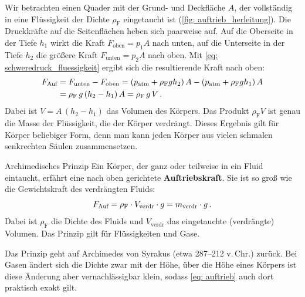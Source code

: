 Wir betrachten einen Quader mit der Grund- und Deckfläche $A$, der vollständig in eine Flüssigkeit der Dichte $\rho_\text{F}$ eingetaucht ist (\cref{fig: auftrieb_herleitung}). Die Druckkräfte auf die Seitenflächen heben sich paarweise auf. Auf die Oberseite in der Tiefe $h_1$ wirkt die Kraft $F_\text{oben} = p_1 A$ nach unten, auf die Unterseite in der Tiefe $h_2$ die größere Kraft $F_\text{unten} = p_2 A$ nach oben. Mit \cref{eq: schweredruck_fluessigkeit} ergibt sich die resultierende Kraft nach oben:
\begin{equation}\begin{aligned}
    F_\text{Auf} &= F_\text{unten} - F_\text{oben} = \left(p_{\mathrm{atm}} + \rho_\text{F} g h_2\right) A - \left(p_{\mathrm{atm}} + \rho_\text{F} g h_1\right) A \\
    &= \rho_\text{F}\, g\, (h_2 - h_1)\, A = \rho_\text{F}\, g\, V \,.
\end{aligned}\end{equation}
Dabei ist $V = A\,(h_2 - h_1)$ das Volumen des Körpers. Das Produkt $\rho_\text{F} V$ ist genau die Masse der Flüssigkeit, die der Körper verdrängt. Dieses Ergebnis gilt für Körper beliebiger Form, denn man kann jeden Körper aus vielen schmalen senkrechten Säulen zusammensetzen.

\begin{rememberbox}{Archimedisches Prinzip}
    Ein Körper, der ganz oder teilweise in ein Fluid eintaucht, erfährt eine nach oben gerichtete \textbf{Auftriebskraft}. Sie ist so groß wie die Gewichtskraft des verdrängten Fluids:
    \begin{equation}\label{eq: auftrieb}
        F_\text{Auf} = \rho_\text{F} \cdot V_\text{verdr} \cdot g = m_\text{verdr} \cdot g \,.
    \end{equation}
    Dabei ist $\rho_\text{F}$ die Dichte des Fluids und $V_\text{verdr}$ das eingetauchte (verdrängte) Volumen. Das Prinzip gilt für Flüssigkeiten und Gase.
\end{rememberbox}
Das Prinzip geht auf Archimedes von Syrakus (etwa 287--212 v.\,Chr.) zurück. Bei Gasen ändert sich die Dichte zwar mit der Höhe, über die Höhe eines Körpers ist diese Änderung aber vernachlässigbar klein, sodass \cref{eq: auftrieb} auch dort praktisch exakt gilt.

